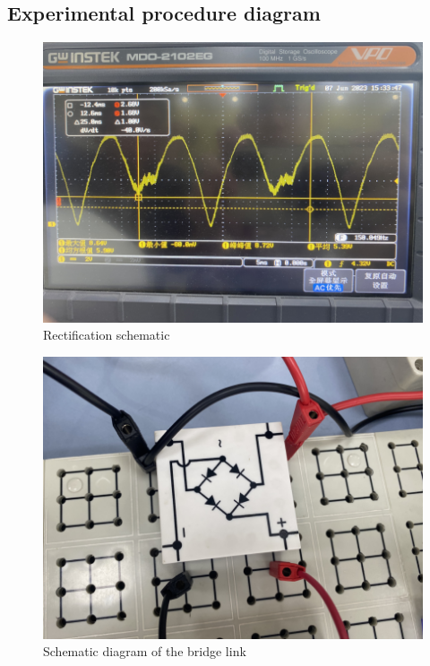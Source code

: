 \documentclass[UTF8]{article}
\begin{document}
\begin{appendix}
\section{Experimental procedure diagram}
    	\begin{figure}[H]
    	    	\centering
    	    	\includegraphics[clip,scale=0.8,trim={0 0 0 0}]{fig/fig15.png}
    	        \caption{Rectification schematic}
    	        \label{figure.15}
        \end{figure}  

    	\begin{figure}[H]
    	    	\centering
    	    	\includegraphics[clip,scale=0.8,trim={0 0 0 0}]{fig/fig16.png}
    	        \caption{Schematic diagram of the bridge link}
    	        \label{figure.16}
        \end{figure}          


\end{appendix}
\end{document}
